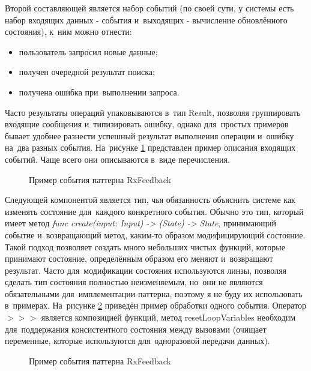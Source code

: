 Второй составляющей является набор событий (по своей сути, у системы есть набор входящих данных - события и~выходящих - вычисление обновлённого состояния), к~ним можно отнести:

\begin{itemize}
  \item пользователь запросил новые данные;
  \item получен очередной результат поиска;
  \item получена ошибка при~выполнении запроса.
\end{itemize}

Часто результаты операций упаковываются в~тип Result, позволяя группировать входящие сообщения и~типизировать ошибку, однако для~простых примеров бывает удобнее разнести успешный результат выполнения операции и~ошибку на~два разных события. На~рисунке \ref{sec:development:arch:ios:rxfeedback:example:event} представлен пример описания входящих событий. Чаще всего они описываются в~виде перечисления.

\begin{figure}[h]
  
   \caption{Пример события паттерна RxFeedback}
   \label{sec:development:arch:ios:rxfeedback:example:event}
\end{figure}

Следующей компонентой является тип, чья обязанность объяснить системе как изменять состояние для~каждого конкретного события. Обычно это тип, который имеет метод \textit{func create(input: Input) -> (State) -> State}, принимающий событие и~возвращающий метод, каким-то образом модифицирующий состояние. Такой подход позволяет создать много небольших чистых функций, которые принимают состояние, определённым образом его меняют и~возвращают результат. Часто для~модификации состояния используются линзы, позволяя сделать тип состояния полностью неизменяемым, но~они не являются обязательными для~имплементации паттерна, поэтому я не буду их использовать в~примерах. На~рисунке \ref{sec:development:arch:ios:rxfeedback:example:mutator} приведён пример обработки одного события. Оператор \(>>>\) является композицией функций, метод resetLoopVariables необходим для~поддержания консистентного состояния между вызовами (очищает переменные, которые используются для~одноразовой передачи данных).

\begin{figure}[h]
  
   \caption{Пример события паттерна RxFeedback}
   \label{sec:development:arch:ios:rxfeedback:example:mutator}
\end{figure}

